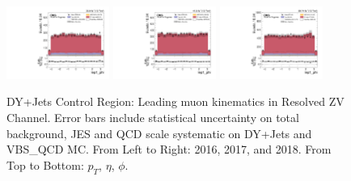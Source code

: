 \begin{figure}[!ht]
  \includegraphics[width=0.30\textwidth]{analysis_plots/2016_zjj/cr_vjets_m/lep1_phi.pdf}
  \includegraphics[width=0.30\textwidth]{analysis_plots/2017_zjj/cr_vjets_m/lep1_phi.pdf}
  \includegraphics[width=0.30\textwidth]{analysis_plots/2018_zjj/cr_vjets_m/lep1_phi.pdf} \\
  \caption[DY+Jets Control Region: Leading muon kinematics in Resolved ZV Channel]%
  {DY+Jets Control Region: Leading muon kinematics in Resolved ZV Channel.
    Error bars include statistical uncertainty on total background,
    JES and QCD scale systematic on DY+Jets and VBS\_QCD MC\@. From Left to Right: 2016,
    2017, and 2018. From Top to Bottom: \( p_T \), \( \eta \), \( \phi \).}%
  \label{fig:zjj-cr-vjets-m-lep1-pt-eta-phi}
\end{figure}

